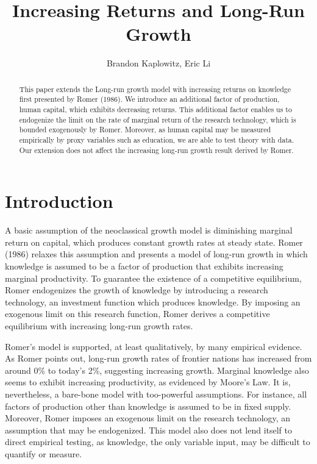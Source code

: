 \documentclass{article}
\begin{document}
\title{Increasing Returns and Long-Run Growth}

\author[1]{Brandon Kaplowitz, Eric Li}
\maketitle

\begin{abstract}
This paper extends the Long-run growth model with increasing returns on knowledge first presented by Romer (1986). We introduce an additional factor of production, human capital, which exhibits decreasing returns. This additional factor enables us to endogenize the limit on the rate of marginal return of the research technology, which is bounded exogenously by Romer. Moreover, as human capital may be measured empirically by proxy variables such as education, we are able to test theory with data. Our extension does not affect the increasing long-run growth result derived by Romer.  

\end{abstract}

\section{Introduction}
A basic assumption of the neoclassical growth model is diminishing marginal return on capital, which produces constant growth rates at steady state. Romer (1986) relaxes this assumption and presents a model of long-run growth in which knowledge is assumed to be a factor of production that exhibits increasing marginal productivity. To guarantee the existence of a competitive equilibrium, Romer endogenizes the growth of knowledge by introducing a research technology, an investment function which produces knowledge. By imposing an exogenous limit on this research function, Romer derives a competitive equilibrium with increasing long-run growth rates. 

Romer's model is supported, at least qualitatively, by many empirical evidence. As Romer points out, long-run growth rates of frontier nations has increased from around 0\% to today's 2\%, suggesting increasing growth. Marginal knowledge also seems to exhibit increasing productivity, as evidenced by Moore's Law. It is, nevertheless, a bare-bone model with too-powerful assumptions. For instance, all factors of production other than knowledge is assumed to be in fixed supply. Moreover, Romer imposes an exogenous limit on the research technology, an assumption that may be endogenized. This model also does not lend itself to direct empirical testing, as knowledge, the only variable input, may be difficult to quantify or measure. 
\end{document}
